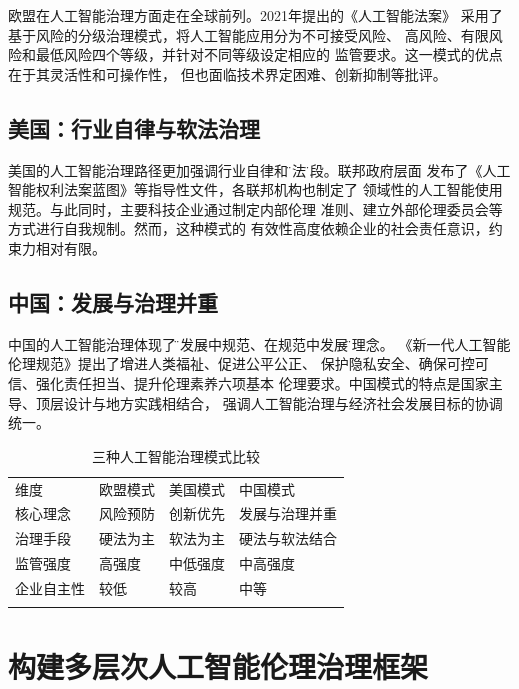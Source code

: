 \documentclass{xmu_course}
\begin{document}
欧盟在人工智能治理方面走在全球前列。2021年提出的《人工智能法案》
采用了基于风险的分级治理模式，将人工智能应用分为不可接受风险、
高风险、有限风险和最低风险四个等级，并针对不同等级设定相应的
监管要求\cite{eu2021}。这一模式的优点在于其灵活性和可操作性，
但也面临技术界定困难、创新抑制等批评。

\subsection{美国：行业自律与软法治理}

美国的人工智能治理路径更加强调行业自律和\"软法\"手段。联邦政府层面
发布了《人工智能权利法案蓝图》等指导性文件，各联邦机构也制定了
领域性的人工智能使用规范。与此同时，主要科技企业通过制定内部伦理
准则、建立外部伦理委员会等方式进行自我规制。然而，这种模式的
有效性高度依赖企业的社会责任意识，约束力相对有限。

\subsection{中国：发展与治理并重}

中国的人工智能治理体现了\"在发展中规范、在规范中发展\"的理念。
《新一代人工智能伦理规范》提出了增进人类福祉、促进公平公正、
保护隐私安全、确保可控可信、强化责任担当、提升伦理素养六项基本
伦理要求。中国模式的特点是国家主导、顶层设计与地方实践相结合，
强调人工智能治理与经济社会发展目标的协调统一。

\begin{table}[htbp]
  \centering
  \caption{三种人工智能治理模式比较}
  \label{tab:governance}
  \begin{tabular}{@{}p{2.5cm}p{3cm}p{3cm}p{3cm}@{}}
    \tabletoprule
    维度     & 欧盟模式 & 美国模式 & 中国模式 \\
    \tablemidrule
    核心理念 & 风险预防 & 创新优先 & 发展与治理并重 \\
    治理手段 & 硬法为主 & 软法为主 & 硬法与软法结合 \\
    监管强度 & 高强度   & 中低强度 & 中高强度 \\
    企业自主性 & 较低   & 较高     & 中等 \\
    \tablebottomrule
  \end{tabular}
\end{table}

\section{构建多层次人工智能伦理治理框架}
\end{document}
